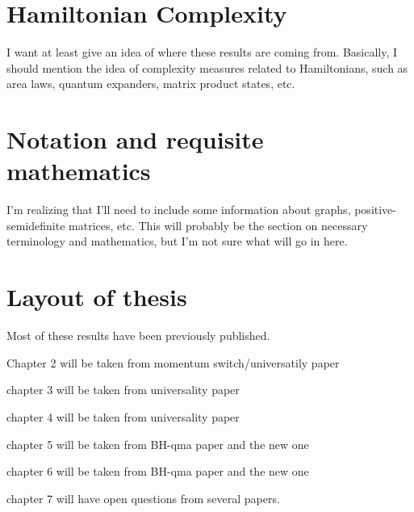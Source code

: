 \documentclass[../thesis-main/thesis-main]{subfiles}
\begin{document}

\section{Hamiltonian Complexity}

I want at least give an idea of where these results are coming from.  Basically, I should mention the idea of complexity measures related to Hamiltonians, such as area laws, quantum expanders, matrix product states, etc.


\section{Notation and requisite mathematics}

I'm realizing that I'll need to include some information about graphs, positive-semidefinite matrices, etc.  This will probably be the section on necessary terminology and mathematics, but I'm not sure what will go in here.


\section{Layout of thesis}

Most of these results have been previously published.

Chapter 2 will be taken from momentum switch/universatily paper

chapter 3 will be taken from universality paper

chapter 4 will be taken from universality paper

chapter 5 will be taken from BH-qma paper and the new one

chapter 6 will be taken from BH-qma paper and the new one

chapter 7 will have open questions from several papers.
\end{document}
